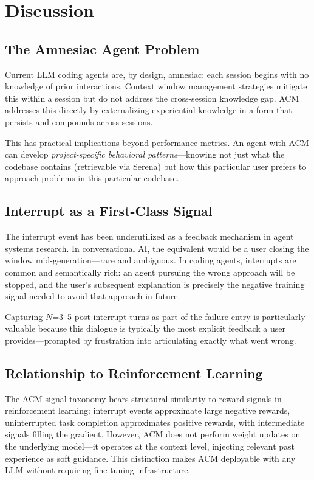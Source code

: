 \documentclass[conference]{IEEEtran}
\begin{document}
\section{Discussion}

\subsection{The Amnesiac Agent Problem}

Current LLM coding agents are, by design, amnesiac: each session begins with no knowledge of prior interactions. Context window management strategies mitigate this within a session but do not address the cross-session knowledge gap. ACM addresses this directly by externalizing experiential knowledge in a form that persists and compounds across sessions.

This has practical implications beyond performance metrics. An agent with ACM can develop \emph{project-specific behavioral patterns}---knowing not just what the codebase contains (retrievable via Serena) but how this particular user prefers to approach problems in this particular codebase.

\subsection{Interrupt as a First-Class Signal}

The interrupt event has been underutilized as a feedback mechanism in agent systems research. In conversational AI, the equivalent would be a user closing the window mid-generation---rare and ambiguous. In coding agents, interrupts are common and semantically rich: an agent pursuing the wrong approach will be stopped, and the user's subsequent explanation is precisely the negative training signal needed to avoid that approach in future.

Capturing $N$=3--5 post-interrupt turns as part of the failure entry is particularly valuable because this dialogue is typically the most explicit feedback a user provides---prompted by frustration into articulating exactly what went wrong.

\subsection{Relationship to Reinforcement Learning}

The ACM signal taxonomy bears structural similarity to reward signals in reinforcement learning: interrupt events approximate large negative rewards, uninterrupted task completion approximates positive rewards, with intermediate signals filling the gradient. However, ACM does not perform weight updates on the underlying model---it operates at the context level, injecting relevant past experience as soft guidance. This distinction makes ACM deployable with any LLM without requiring fine-tuning infrastructure.
\end{document}

